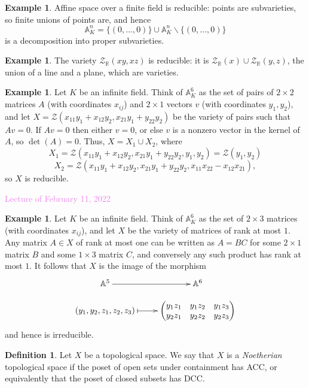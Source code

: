 \documentclass{amsart}[12pt]
\newcommand{\Feb}[1]{\textcolor{violet}{Lecture of February #1, 2022}}
\newcommand{\A}{\mathbb{A}}
\newcommand{\R}{{\mathbb{R}}}
\newcommand{\cZ}{\mathcal{Z}}
\newcommand{\DEF}[1]{\emph{#1}\index{#1}}
\numberwithin{equation}{section}
\theoremstyle{plain} %
\theoremstyle{definition}
\newtheorem{defn}[equation]{Definition}
\newtheorem{ex}[equation]{Example}
\theoremstyle{remark}
\begin{document}
\begin{ex} Affine space over a finite field is reducible: points are subvarieties, so finite unions of points are, and hence \[\A^n_K = \{(0,\dots,0)\} \cup \A^n_K \smallsetminus \{(0,\dots,0)\}\] is a decomposition into proper subvarieties.
\end{ex}

\begin{ex} The variety $\cZ_\R(xy,xz)$ is reducible: it is $\cZ_{\R}(x) \cup \cZ_{\R}(y,z)$, the union of a line and a plane, which are varieties.
\end{ex}

\begin{ex} Let $K$ be an infinite field. Think of $\A^6_K$ as the set of pairs of $2\times 2$ matrices $A$ (with coordinates $x_{ij}$) and $2\times 1$ vectors $v$ (with coordinates $y_1,y_2$), and let $X=\cZ(x_{11} y_1 + x_{12} y_2, x_{21} y_1 + y_{22} y_2)$ be the variety of pairs such that $Av=0$. If $Av=0$ then either $v=0$, or else $v$ is a nonzero vector in the kernel of $A$, so $\det(A)=0$. Thus, $ X= X_1 \cup X_2$, where \[ X_1 = \cZ(x_{11} y_1 + x_{12} y_2, x_{21} y_1 + y_{22} y_2,  y_1, y_2) = \cZ(y_1, y_2)\]
\[ X_2= \cZ(x_{11} y_1 + x_{12} y_2, x_{21} y_1 + y_{22} y_2, x_{11} x_{22} - x_{12} x_{21}) ,\]
so $X$ is reducible.
\end{ex}


\Feb{11}

\begin{ex} Let $K$ be an infinite field. Think of $\A^6_K$ as the set of $2\times 3$ matrices (with coordinates $x_{ij}$), and let $X$ be the variety of matrices of rank at most $1$. Any matrix $A\in X$ of rank at most one can be written as $A= B C$ for some $2\times 1$ matrix $B$ and some $1\times 3$ matrix $C$, and conversely any such product has rank at most $1$. It follows that $X$ is the image of the morphism \[ \xymatrix@R=1em{ \A^5 \ar[r] & \A^6 \\ (y_1,y_2,z_1,z_2,z_3) \ar@{|->}[r] & {\begin{pmatrix} y_1 z_1 & y_1 z_2 & y_1 z_3 \\ y_2 z_1 & y_2 z_2 & y_2 z_3\end{pmatrix}} } \]
and hence is irreducible.
\end{ex}




\begin{defn} Let $X$ be a topological space. We say that $X$ is a \DEF{Noetherian} topological space if the poset of open sets under containment has ACC, or equivalently that the poset of closed subsets has DCC.
\end{defn}
\end{document}
